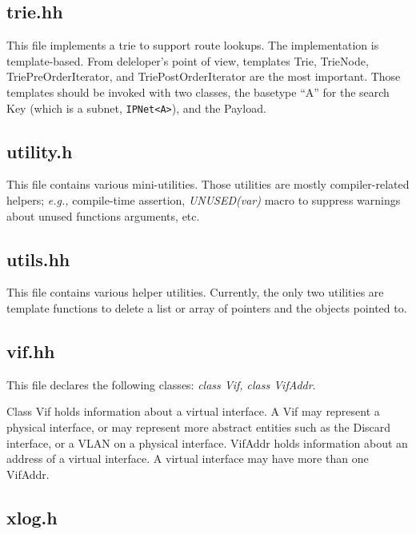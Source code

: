 \documentclass[11pt]{article}
\newcommand{\eg}{\emph{e.g.,}\xspace}
\begin{document}
\subsection{trie.hh}

This file implements a trie to support route lookups.
The implementation is template-based. From deleloper's point
of view, templates Trie, TrieNode, TriePreOrderIterator,
and TriePostOrderIterator
are the most important. Those templates should be invoked with two
classes, the basetype ``A'' for the search Key (which is a subnet,
\verb=IPNet<A>=), and the Payload.

\subsection{utility.h}

This file contains various mini-utilities.  Those utilities are mostly
compiler-related helpers; \eg compile-time assertion, \emph{UNUSED(var)}
macro to suppress warnings about unused functions arguments, etc.

\subsection{utils.hh}

This file contains various helper utilities. Currently, the only two
utilities are template functions to delete a list or array
of pointers and the objects pointed to.

\subsection{vif.hh}

This file declares the following classes: \emph{class Vif, class
VifAddr}.

Class Vif holds information about a virtual interface.  A Vif may
represent a physical interface, or may represent more abstract
entities such as the Discard interface, or a VLAN on a physical
interface.
VifAddr holds information about an address of a virtual interface.
A virtual interface may have more than one VifAddr.

\subsection{xlog.h}
\end{document}
